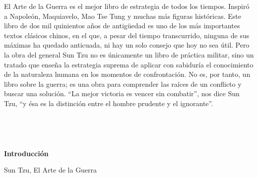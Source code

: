 \documentclass[openany]{book}
\begin{document}
\begin{adjustwidth}{1.8cm}{0cm}
El Arte de la Guerra es el mejor libro de estrategia de todos
  los tiempos. Inspiró a Napoleón, Maquiavelo, Mao Tse Tung 
  y muchas más figuras históricas. Este libro de dos mil 
  quinientos años de antigüedad es uno de los más importantes
  textos clásicos chinos, en el que, a pesar del tiempo 
  transcurrido, ninguna de sus máximas ha quedado anticuada, 
  ni hay un solo consejo que hoy no sea útil. Pero la
  obra del general Sun Tzu no es únicamente un libro 
  de práctica militar, sino un tratado que enseña la 
  estrategia suprema de aplicar con sabiduría el conocimiento
  de la naturaleza humana en los momentos de confrontación.
  No es, por tanto, un libro sobre la guerra; es una obra
  para comprender las raíces de un conflicto y buscar
  una solución. ``La mejor victoria es vencer sin combatir'',
  nos dice Sun Tzu, ``y ésa es la distinción entre el hombre
  prudente y el ignorante''.

\end{adjustwidth}


\newpage 
\clearpage 
\thispagestyle{empty}
\ 
\newpage 

\thispagestyle{empty}
\setcounter{page}{1}

\tableofcontents


\newpage 
\clearpage 
\thispagestyle{empty}
\ 
\clearpage 
\newpage

\thispagestyle{empty}

\begin{center}
  \begin{LARGE}
    \textbf{Introducción} \\
  \end{LARGE}
\end{center}

\begin{large}
  \begin{center}
  Sun Tzu, El Arte de la Guerra
  \end{center}
\end{large}
\end{document}
